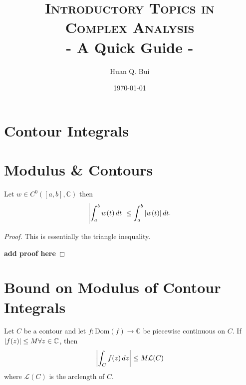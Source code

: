 \documentclass{article}
\theoremstyle{definition}
\newcommand{\C}{\mathbb{C}}
\newcommand{\lag}{\mathcal{L}}
\begin{document}
	\begin{titlepage}\centering
		\clearpage
		\title{\textsc{\bf{Introductory Topics in \\ Complex Analysis}}\\\smallskip - A Quick Guide -\\}
		\author{\bigskip Huan Q. Bui}
		\date{\today}
		\maketitle
		\thispagestyle{empty}
	\end{titlepage}




\newpage
\tableofcontents
\newpage


\section{Contour Integrals}



\section{Modulus \& Contours}

Let $w \in C^0([a,b], \C)$ then 
\begin{align}
\abs{\int^b_aw(t)\,dt} \leq \int^b_a \abs{w(t)}\,dt.
\end{align}

\begin{proof}
	This is essentially the triangle inequality. 
	
	\textbf{add proof here}
\end{proof}



\section{Bound on Modulus of Contour Integrals}

Let $C$ be a contour and let $f: \text{Dom}(f) \to \C$ be piecewise continuous on $C$. If $\abs{f(z)} \leq M \forall z \in \C$, then 
\begin{align}
\abs{\int_C f(z)\,dz} \leq M\lag(C)
\end{align} 
where $\lag(C)$ is the arclength of $C$.
\end{document}
